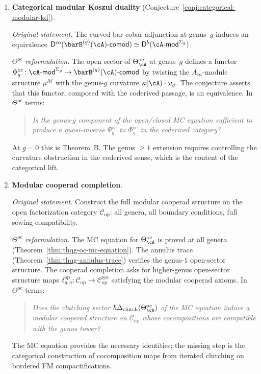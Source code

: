 \begin{enumerate}[resume, label=\textup{(\arabic*)}]

\item \textbf{Categorical modular Koszul duality}
 (Conjecture~\ref{conj:categorical-modular-kd}).

 \smallskip\noindent
 \emph{Original statement.}
 The curved bar-cobar adjunction at genus~$g$ induces an
 equivalence
 $\mathsf{D}^{\mathrm{co}}
 (\barB^{(g)}(\cA)\text{-}\mathsf{comod})
 \simeq
 \mathsf{D}^b(\cA\text{-}\mathsf{mod}^{\Sigma_g})$.

 \smallskip\noindent
 \emph{$\Theta^{\mathrm{oc}}$ reformulation.}
 The open sector of $\Theta^{\mathrm{oc}}_\cA$ at genus~$g$
 defines a functor
 $\Phi_g^{\mathrm{oc}} \colon
 \cA\text{-}\mathsf{mod}^{\Sigma_g}
 \to
 \barB^{(g)}(\cA)\text{-}\mathsf{comod}$
 by twisting the $A_\infty$-module structure
 $\mu^{\mathcal{M}}$ with the genus-$g$ curvature
 $\kappa(\cA) \cdot \omega_g$. The conjecture asserts that
 this functor, composed with the coderived passage, is an
 equivalence. In $\Theta^{\mathrm{oc}}$ terms:
 \begin{quote}
 \emph{Is the genus-$g$ component of the open/closed MC
 equation sufficient to produce a quasi-inverse
 $\Psi_g^{\mathrm{oc}}$ to $\Phi_g^{\mathrm{oc}}$ in the
 coderived category?}
 \end{quote}
 At $g = 0$ this is Theorem~B. The genus $\geq 1$
 extension requires controlling the curvature obstruction
 in the coderived sense, which is the
 content of the categorical lift.

\item \textbf{Modular cooperad completion}.

 \smallskip\noindent
 \emph{Original statement.}
 Construct the full modular cooperad structure on the open
 factorization category $\mathcal{C}_{\mathrm{op}}$: all genera,
 all boundary conditions, full sewing compatibility.

 \smallskip\noindent
 \emph{$\Theta^{\mathrm{oc}}$ reformulation.}
 The MC equation for $\Theta^{\mathrm{oc}}_\cA$ is proved at
 all genera (Theorem~\ref{thm:thqg-oc-mc-equation}). The
 annulus trace (Theorem~\ref{thm:thqg-annulus-trace}) verifies
 the genus-$1$ open-sector structure. The cooperad completion
 asks for higher-genus open-sector structure maps
 $\delta_{g,n}^{\mathrm{op}} \colon
 \mathcal{C}_{\mathrm{op}} \to
 \mathcal{C}_{\mathrm{op}}^{\otimes n}$
 satisfying the modular cooperad axioms. In
 $\Theta^{\mathrm{oc}}$ terms:
 \begin{quote}
 \emph{Does the clutching sector
 $\hbar\Delta_{\mathrm{clutch}}(\Theta^{\mathrm{oc}}_\cA)$
 of the MC equation induce a modular cooperad structure on
 $\mathcal{C}_{\mathrm{op}}$ whose
 cocompositions are compatible with the genus tower?}
 \end{quote}
 The MC equation provides the necessary identities; the missing
 step is the categorical construction of cocomposition
 maps from iterated clutching on bordered FM compactifications.


\end{enumerate}
